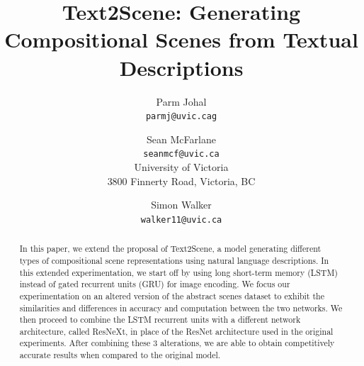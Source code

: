 \documentclass[10pt,twocolumn,letterpaper]{article}
\begin{document}
\title{Text2Scene: Generating Compositional Scenes from Textual Descriptions}

\author{Parm Johal\\
{\tt\small parmj@uvic.cag}
\and
Sean McFarlane\\
{\tt\small seanmcf@uvic.ca}\\
University of Victoria\\
3800 Finnerty Road, Victoria, BC
\and
Simon Walker\\
{\tt\small walker11@uvic.ca}
}

\maketitle

\begin{abstract}
In this paper, we extend the proposal of Text2Scene, a model generating different types of compositional scene representations using natural language descriptions. In this extended experimentation, we start off by using long short-term memory (LSTM) instead of gated recurrent units (GRU) for image encoding. We focus our experimentation on an altered version of the abstract scenes dataset to exhibit the similarities and differences in accuracy and computation between the two networks. We then proceed to combine the LSTM recurrent units with a different network architecture, called ResNeXt, in place of the ResNet architecture used in the original experiments. After combining these 3 alterations, we are able to obtain competitively accurate results when compared to the original model.
\end{abstract}

\end{document}
